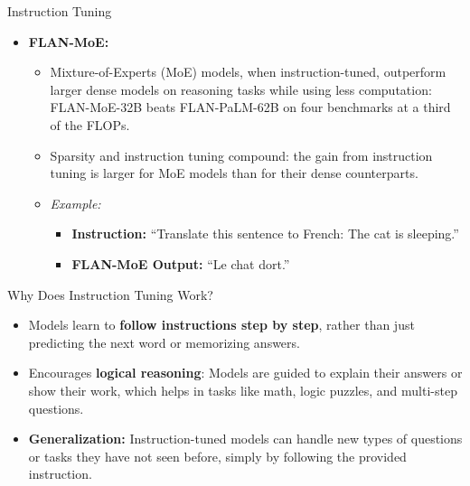 \begin{frame}[allowframebreaks]{Instruction Tuning}
\begin{itemize}
\begin{itemize}
                \item \textit{Example:}
                \begin{itemize}
                    \item \textbf{Instruction:} ``Read the passage and answer: What did the boy do after school?''
                    \item \textbf{Passage:} ``The boy finished his homework and went to play soccer.''
                    \item \textbf{FLAN-T5 Output:} ``He went to play soccer.''
                \end{itemize}
            \end{itemize}
            \framebreak
            \item \textbf{FLAN-MoE:}
            \begin{itemize}
                \item Mixture-of-Experts (MoE) models, when instruction-tuned, outperform larger dense models on reasoning tasks while using less computation: FLAN-MoE-32B beats FLAN-PaLM-62B on four benchmarks at a third of the FLOPs.
                \item Sparsity and instruction tuning compound: the gain from instruction tuning is larger for MoE models than for their dense counterparts.
                \item \textit{Example:}
                \begin{itemize}
                    \item \textbf{Instruction:} ``Translate this sentence to French: The cat is sleeping.''
                    \item \textbf{FLAN-MoE Output:} ``Le chat dort.''
                \end{itemize}
            \end{itemize}
        \end{itemize}
\framebreak
    \begin{block}{Why Does Instruction Tuning Work?}
        \begin{itemize}
            \item Models learn to \textbf{follow instructions step by step}, rather than just predicting the next word or memorizing answers.
            \item Encourages \textbf{logical reasoning}: Models are guided to explain their answers or show their work, which helps in tasks like math, logic puzzles, and multi-step questions.
            \item \textbf{Generalization:} Instruction-tuned models can handle new types of questions or tasks they have not seen before, simply by following the provided instruction.

\end{itemize}
\end{block}
\end{frame}
